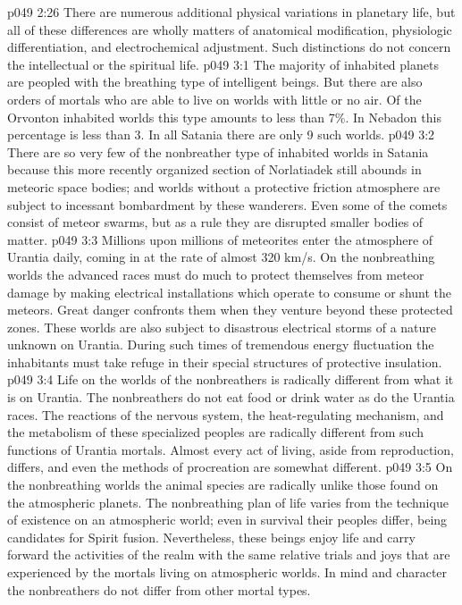 \vs p049 2:26 \bibnobreakspace {} There are numerous additional physical variations in planetary life, but all of these differences are wholly matters of anatomical modification, physiologic differentiation, and electrochemical adjustment. Such distinctions do not concern the intellectual or the spiritual life.
\vs p049 3:1 The majority of inhabited planets are peopled with the breathing type of intelligent beings. But there are also orders of mortals who are able to live on worlds with little or no air. Of the Orvonton inhabited worlds this type amounts to less than 7\%. In Nebadon this percentage is less than 3. In all Satania there are only 9 such worlds.
\vs p049 3:2 There are so very few of the nonbreather type of inhabited worlds in Satania because this more recently organized section of Norlatiadek still abounds in meteoric space bodies; and worlds without a protective friction atmosphere are subject to incessant bombardment by these wanderers. Even some of the comets consist of meteor swarms, but as a rule they are disrupted smaller bodies of matter.
\vs p049 3:3 Millions upon millions of meteorites enter the atmosphere of Urantia daily, coming in at the rate of almost 320 km/s. On the nonbreathing worlds the advanced races must do much to protect themselves from meteor damage by making electrical installations which operate to consume or shunt the meteors. Great danger confronts them when they venture beyond these protected zones. These worlds are also subject to disastrous electrical storms of a nature unknown on Urantia. During such times of tremendous energy fluctuation the inhabitants must take refuge in their special structures of protective insulation.
\vs p049 3:4 Life on the worlds of the nonbreathers is radically different from what it is on Urantia. The nonbreathers do not eat food or drink water as do the Urantia races. The reactions of the nervous system, the heat\hyp{}regulating mechanism, and the metabolism of these specialized peoples are radically different from such functions of Urantia mortals. Almost every act of living, aside from reproduction, differs, and even the methods of procreation are somewhat different.
\vs p049 3:5 On the nonbreathing worlds the animal species are radically unlike those found on the atmospheric planets. The nonbreathing plan of life varies from the technique of existence on an atmospheric world; even in survival their peoples differ, being candidates for Spirit fusion. Nevertheless, these beings enjoy life and carry forward the activities of the realm with the same relative trials and joys that are experienced by the mortals living on atmospheric worlds. In mind and character the nonbreathers do not differ from other mortal types.
